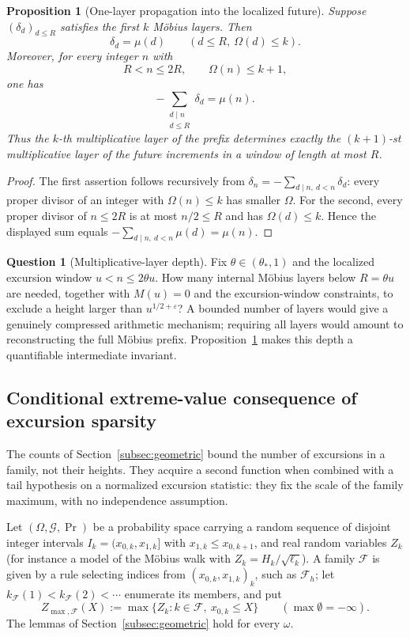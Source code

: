 \documentclass[11pt]{amsart}
\numberwithin{equation}{section}
\theoremstyle{plain}
\newtheorem{proposition}[theorem]{Proposition}
\theoremstyle{definition}
\newtheorem{question}[theorem]{Question}
\theoremstyle{remark}
\newcommand{\eps}{\varepsilon}
\newcommand{\F}{\mathcal{F}}
\begin{document}
\begin{proposition}[One-layer propagation into the localized future]
\label{prop:layer-propagation}
Suppose $(\delta_d)_{d\le R}$ satisfies the first $k$ M\"obius layers. Then
\[
\delta_d=\mu(d)\qquad(d\le R,\ \Omega(d)\le k).
\]
Moreover, for every integer $n$ with
\[
R<n\le2R,\qquad\Omega(n)\le k+1,
\]
one has
\[
-\sum_{\substack{d\mid n\\d\le R}}\delta_d=\mu(n).
\]
Thus the $k$-th multiplicative layer of the prefix determines exactly the
$(k+1)$-st multiplicative layer of the future increments in a window of
length at most $R$.
\end{proposition}

\begin{proof}
The first assertion follows recursively from
$\delta_n=-\sum_{d\mid n,\ d<n}\delta_d$: every proper divisor of an
integer with $\Omega(n)\le k$ has smaller $\Omega$.  For the second, every
proper divisor of $n\le2R$ is at most $n/2\le R$ and has
$\Omega(d)\le k$.  Hence the displayed sum equals
$-\sum_{d\mid n,\ d<n}\mu(d)=\mu(n)$.
\end{proof}

\begin{question}[Multiplicative-layer depth]
\label{q:layer-depth}
Fix $\theta\in(\theta_*,1)$ and the localized excursion window
$u<n\le2\theta u$.  How many internal M\"obius layers below
$R=\theta u$ are needed, together with $M(u)=0$ and the excursion-window
constraints, to exclude a height larger than $u^{1/2+\eps}$?  A bounded
number of layers would give a genuinely compressed arithmetic mechanism;
requiring all layers would amount to reconstructing the full M\"obius
prefix.  Proposition~\ref{prop:layer-propagation} makes this depth a
quantifiable intermediate invariant.
\end{question}

\subsection{Conditional extreme-value consequence of excursion sparsity}
\label{subsec:extreme}

The counts of Section~\ref{subsec:geometric} bound the number of excursions
in a family, not their heights. They acquire a second function when combined
with a tail hypothesis on a normalized excursion statistic: they fix the
scale of the family maximum, with no independence assumption.

Let $(\Omega,\mathcal G,\Pr)$ be a probability space carrying a random
sequence of disjoint integer intervals $I_k=(x_{0,k},x_{1,k}]$ with
$x_{1,k}\le x_{0,k+1}$, and real random variables $Z_k$ (for instance a model
of the M\"obius walk with $Z_k=H_k/\sqrt{\ell_k}$). A family $\F$ is given by
a rule selecting indices from $(x_{0,k},x_{1,k})_k$, such as $\F_h$; let
$k_\F(1)<k_\F(2)<\cdots$ enumerate its members, and put
\[
Z_{\max,\F}(X):=\max\{Z_k:k\in\F,\ x_{0,k}\le X\}\qquad(\max\emptyset=-\infty).
\]
The lemmas of Section~\ref{subsec:geometric} hold for every $\omega$.
\end{document}
